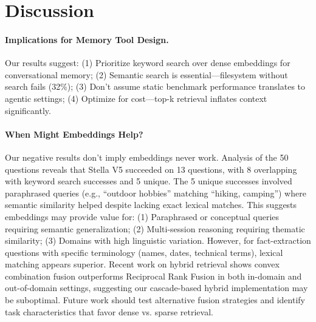 \documentclass{article}
\begin{document}
\section{Discussion}
\label{sec:discussion}

\paragraph{Implications for Memory Tool Design.}
Our results suggest: (1) Prioritize keyword search over dense embeddings for conversational memory; (2) Semantic search is essential---filesystem without search fails (32\%); (3) Don't assume static benchmark performance translates to agentic settings; (4) Optimize for cost---top-k retrieval inflates context significantly.

\paragraph{When Might Embeddings Help?}
Our negative results don't imply embeddings never work. Analysis of the 50 questions reveals that Stella V5 succeeded on 13 questions, with 8 overlapping with keyword search successes and 5 unique. The 5 unique successes involved paraphrased queries (e.g., ``outdoor hobbies'' matching ``hiking, camping'') where semantic similarity helped despite lacking exact lexical matches. This suggests embeddings may provide value for: (1) Paraphrased or conceptual queries requiring semantic generalization; (2) Multi-session reasoning requiring thematic similarity; (3) Domains with high linguistic variation. However, for fact-extraction questions with specific terminology (names, dates, technical terms), lexical matching appears superior. Recent work on hybrid retrieval \cite{bruch2022hybrid} shows convex combination fusion outperforms Reciprocal Rank Fusion in both in-domain and out-of-domain settings, suggesting our cascade-based hybrid implementation may be suboptimal. Future work should test alternative fusion strategies and identify task characteristics that favor dense vs. sparse retrieval.
\end{document}
